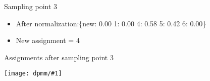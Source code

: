 \documentclass[compress]{beamer}
\newcommand{\gfx}[2]{
\begin{center}
	\texttt{[image: dpmm/\#1]}
\end{center}
}
\begin{document}
\begin{frame}{Sampling point 3}
\begin{itemize}
\begin{tiny}
\begin{align}
\only<5->{p(z_{3} = 6\,|\, \vec{z_{-3}}, \vec{x}, \alpha) & \propto \frac{1.00}{6 + 0.25} \mathcal{N} \left( \begin{array}{c} -9.00 \\ -10.00 \\ \end{array} \, \g \, \begin{array}{c} 0.50 \\ 0.50 \\ \end{array}, \mathbb{1} \right) = 0.16 \times 0.00000}
\end{align}\end{tiny}
\pause
\item<6-> After normalization:\{new: 0.00	1: 0.00	4: 0.58	5: 0.42	6: 0.00\}\pause\item<7-> New assignment = 4
\end{itemize}
\end{frame}



\begin{frame}{Assignments after sampling point 3}
    \gfx{dpmm4}{.8}
    \end{frame}
\end{document}

